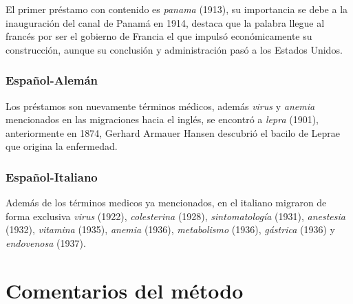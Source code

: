 El primer préstamo con contenido es \textit{panama} (1913), su importancia se debe a la inauguración del canal de Panamá en 1914, destaca que la palabra llegue al francés por ser el gobierno de Francia el que impulsó económicamente su construcción, aunque su conclusión y administración pasó a los Estados Unidos.  




\subsubsection*{Español-Alemán}


Los préstamos son nuevamente términos médicos, además \textit{virus} y \textit{anemia} mencionados en las migraciones hacia el inglés, se encontró a \textit{lepra} (1901), anteriormente en 1874, Gerhard Armauer Hansen descubrió el bacilo de Leprae que origina la enfermedad.



\subsubsection*{Español-Italiano}%


Además de los términos medicos ya mencionados, en el italiano migraron de forma  exclusiva  \textit{virus} (1922), \textit{colesterina} (1928),  \textit{sintomatología} (1931), \textit{anestesia} (1932), \textit{vitamina} (1935), \textit{anemia} (1936), \textit{metabolismo} (1936),  \textit{gástrica} (1936)  y \textit{endovenosa} (1937).  







\section{Comentarios del método}%



